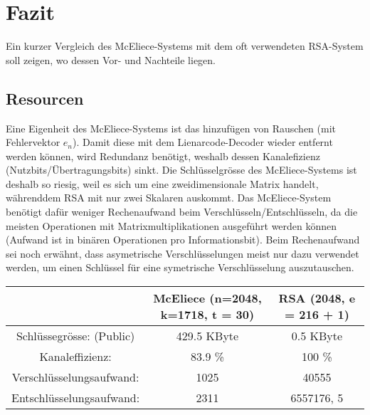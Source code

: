 %
%
%
\section{Fazit
\label{mceliece:section:fazit}}
Ein kurzer Vergleich des McEliece-Systems
mit dem oft verwendeten RSA-System soll zeigen, wo dessen Vor- und Nachteile liegen.

\subsection{Resourcen}
Eine Eigenheit des McEliece-Systems ist das hinzufügen von Rauschen (mit Fehlervektor $e_n$).
Damit diese mit dem Lienarcode-Decoder wieder entfernt werden können,
wird Redundanz benötigt,
weshalb dessen Kanalefizienz (Nutzbits/Übertragungsbits) sinkt.
Die Schlüsselgrösse des McEliece-Systems ist deshalb so riesig, weil es sich um eine zweidimensionale Matrix handelt, währenddem RSA mit nur zwei Skalaren auskommt.
Das McEliece-System benötigt dafür weniger Rechenaufwand beim Verschlüsseln/Entschlüsseln, da die meisten Operationen mit Matrixmultiplikationen ausgeführt werden können (Aufwand ist in binären Operationen pro Informationsbit)\cite{mceliece:CodeBasedCrypto}.
Beim Rechenaufwand sei noch erwähnt,
dass asymetrische Verschlüsselungen meist nur dazu verwendet werden,
um einen Schlüssel für eine symetrische Verschlüsselung auszutauschen.
\begin{center}
\begin{tabular}{c|c|c}
                                &McEliece (n=2048, k=1718, t = 30)  &RSA (2048, e = 216 + 1)\\
    \hline
    Schlüssegrösse: (Public)    &429.5 KByte                        &0.5 KByte              \\
    Kanaleffizienz:             &83.9 \%                            &100 \%                 \\
    Verschlüsselungsaufwand:    &1025                               &40555                  \\
    Entschlüsselungsaufwand:    &2311                               &6557176, 5
\end{tabular}
\end{center}


